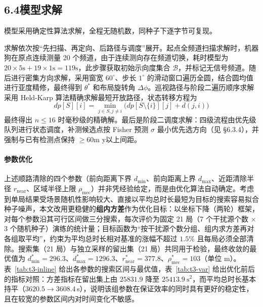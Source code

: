 \documentclass[UTF8, zihao=5,AutoFakeBold=2]{ctexart}
\begin{document}
\subsection*{6.4模型求解}

模型采用确定性算法求解，全程无随机数，同种子下逐字节可复现。

求解依次按“先扫描、再定向、后路径与调度”展开。起点全频道扫描求解时，机器狗在原点连续测量 20 个频道，由于连续测向存在频道切换，耗时模型为 \(20 \times 5\text{s} + 19 \times 1\text{s} = 119\text{s}\)，此步骤获取初始示向度集合 \(\mathcal{B}\)，并标记无信号频道。随后进行密集方向求解，采用窗宽 \(60^{\circ}\)、步长 \(1^{\circ}\) 的滑动窗口遍历全圆，结合圆均值进行亚度精修，最终得到 \(\theta^*\) 和布局旋转角 \(\Delta\phi\)。巡视路径与阶段二遍历顺序求解采用 Held-Karp 算法精确求解最短开放路径，状态转移方程为
\begin{equation}
dp[S][i] = \min_{j \in S, j \neq i} \bigl( dp[S \setminus \{i\}][j] + d(j,i) \bigr)
\end{equation}
最终得出 \(n \leq 16\) 时毫秒级的精确解。最后是阶段二调度求解：四级流程由优先级队列进行状态调度，补测候选点按 Fisher 预测 \(\sigma\) 最小优先选方向（见 \S6.3.4），并强制与已有检测点保持 \(\geq 60\text{m}\) y以上间距。


\paragraph{参数优化}
上述顺路清除的四个参数（前向距离下界 \(d_{\min}\)、前向距离上界 \(d_{\max}\)、近距清除半径 \(r_{\text{near}}\)、区域半径上限 \(\rho_{\text{mec}}\)）并非凭经验给定，而是由优化算法自动确定。考虑到单局结果受场景随机性影响较大、直接以平均总时长最短为目标的搜索容易拟合种子噪声，本文改用更稳健的\textbf{组内方差}作为优化目标：以坐标下降（两轮）框架，对每个参数沿其可行区间做三分搜索，每次评价为固定 21 局（7 个干扰源个数 \(\times\) 3 个随机种子）演练的统计量；目标函数为“按干扰源个数分组、组内求方差再对各组取平均”，约束为平均总时长相对基准的涨幅不超过 \(1.5\%\) 且每局必须全部清除。搜索集（21 局）与独立采样的留出集（21 局）共同用于检验，最终收敛的最优值为 \(d_{\min}^*=296.3\)、\(d_{\max}^*=1296.3\)、\(r_{\text{near}}^*=377.8\)、\(\rho_{\text{mec}}^*=103\)（单位 m）。表~\ref{tab:t3-inline} 给出各参数的搜索区间与最优值，表~\ref{tab:t3-var} 给出优化前后的指标对照：方差指标在留出集上由 \(25831.9\) 降至 \(25413.9\ \text{s}^2\)，而平均总时长基本持平（\(3620.5\to3608.4\)\,s），说明该组参数在保证效率的同时具有更好的稳定性，且在较宽的参数区间内对时间变化不敏感。
\end{document}
